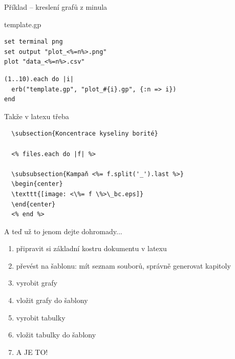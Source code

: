 \documentclass{beamer}
\begin{document}
\begin{frame}[fragile]{Příklad -- kreslení grafů z minula}
  \begin{block}{template.gp}
    \scriptsize
    \begin{verbatim}
set terminal png
set output "plot_<%=n%>.png"
plot "data_<%=n%>.csv"
    \end{verbatim}
  \end{block}
  \begin{block}{}
    \scriptsize
    \begin{verbatim}
(1..10).each do |i|
  erb("template.gp", "plot_#{i}.gp", {:n => i})
end
    \end{verbatim}
  \end{block}
\end{frame}

\begin{frame}[fragile]{Takže v latexu třeba}
\scriptsize
\begin{verbatim}
  \subsection{Koncentrace kyseliny borité}

  <% files.each do |f| %>

  \subsubsection{Kampaň <%= f.split('_').last %>}
  \begin{center}
  \texttt{[image: <\%= f \%>\_bc.eps]}
  \end{center}
  <% end %>
\end{verbatim}
\end{frame}

\begin{frame}{A teď už to jenom dejte dohromady...}
  \begin{enumerate}
    \item připravit si základní kostru dokumentu v latexu
    \item převést na šablonu: mít seznam souborů, správně generovat kapitoly
    \item vyrobit grafy
    \item vložit grafy do šablony
    \item vyrobit tabulky
    \item vložit tabulky do šablony
    \item A JE TO!
  \end{enumerate}
\end{frame}
\end{document}
